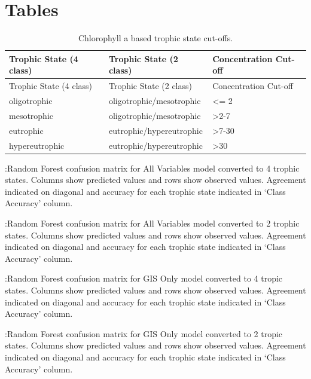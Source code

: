 \documentclass[11pt,]{article}
\begin{document}
\newpage

\newpage

\section{Tables}\label{tables}

\begin{longtable}[c]{@{}lll@{}}
\caption{Chlorophyll a based trophic state cut-offs.
\label{tab:trophicStateTable}}\tabularnewline
\toprule
Trophic State (4 class) & Trophic State (2 class) & Concentration
Cut-off\tabularnewline
\midrule
\endfirsthead
\toprule
Trophic State (4 class) & Trophic State (2 class) & Concentration
Cut-off\tabularnewline
\midrule
\endhead
oligotrophic & oligotrophic/mesotrophic & \textless{}= 2\tabularnewline
mesotrophic & oligotrophic/mesotrophic &
\textgreater{}2-7\tabularnewline
eutrophic & eutrophic/hypereutrophic & \textgreater{}7-30\tabularnewline
hypereutrophic & eutrophic/hypereutrophic &
\textgreater{}30\tabularnewline
\bottomrule
\end{longtable}

\newpage

:Random Forest confusion matrix for All Variables model converted to 4
trophic states. Columns show predicted values and rows show observed
values. Agreement indicated on diagonal and accuracy for each trophic
state indicated in `Class Accuracy' column. \label{tab:Confusion_All_4}

\newpage

:Random Forest confusion matrix for All Variables model converted to 2
trophic states. Columns show predicted values and rows show observed
values. Agreement indicated on diagonal and accuracy for each trophic
state indicated in `Class Accuracy' column. \label{tab:Confusion_All_2}

\newpage

:Random Forest confusion matrix for GIS Only model converted to 4 tropic
states. Columns show predicted values and rows show observed values.
Agreement indicated on diagonal and accuracy for each trophic state
indicated in `Class Accuracy' column. \label{tab:Confusion_GIS_4}

\newpage

:Random Forest confusion matrix for GIS Only model converted to 2 tropic
states. Columns show predicted values and rows show observed values.
Agreement indicated on diagonal and accuracy for each trophic state
indicated in `Class Accuracy' column. \label{tab:Confusion_GIS_2}
\newpage
\end{document}
